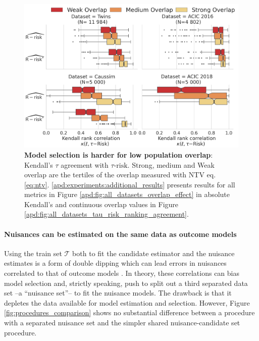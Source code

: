 \documentclass{report}
\begin{document}
\begin{figure}[h!]
  \begin{minipage}{.35\linewidth}
    \caption{\textbf{Model selection is harder for low population
        overlap}:
      Kendall's $\tau$ agreement with $\tau\text{-risk}$. Strong, medium and Weak overlap
      are the tertiles of the overlap measured with NTV eq. \ref{eq:ntv}. \ref{apd:experiments:additional_results} presents results for all
      metrics in Figure \ref{apd:fig:all_datasets_overlap_effect} in absolute
      Kendall's and continuous overlap values in Figure
        {\ref{apd:fig:all_datasets_tau_risk_ranking_agreement}}.}\label{fig:all_datasets_overlap_effect_r_risk}
  \end{minipage}
  \hfill
  \begin{minipage}{0.6\linewidth}
    \centering
    \includegraphics[width=\linewidth]{img/chapter_5/_2_overlap_influence_overlap_by_bin_comparaison_kendall_by_Dataset_r_risk_only.png}
  \end{minipage}
\end{figure}

\paragraph{Nuisances can be estimated on the same data as outcome models}

Using the train set $\mathcal{T}$ both to fit the candidate estimator and the
nuisance estimates is a form of double dipping which can lead errors in
nuisances correlated to that of outcome models
\citep{nie_quasioracle_2017}. In theory, these correlations can bias model
selection and, strictly speaking, push
to split out a third separated data set --a ``nuisance set''-- to fit the
nuisance models. The drawback is that it depletes the data available for
model estimation and selection. However, Figure
\ref{fig:procedures_comparison} shows no substantial difference between a procedure with a separated
nuisance set and the simpler shared nuisance-candidate set procedure.
\end{document}
